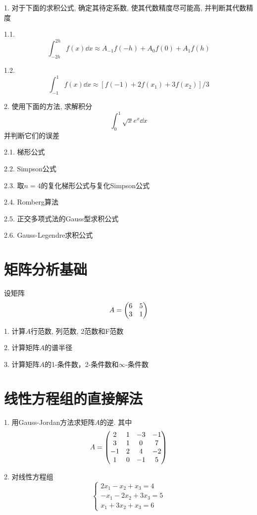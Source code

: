 1. 对于下面的求积公式, 确定其待定系数, 使其代数精度尽可能高, 并判断其代数精度

1.1. \begin{equation*}
    \int_{-2h}^{2h}f(x)\dd{x}\approx A_{-1}f(-h)+A_0f(0)+A_1f(h)
\end{equation*}

1.2. \begin{equation*}
    \int_{-1}^1f(x)\dd{x}\approx\left[f(-1)+2f(x_1)+3f(x_2)\right]/3
\end{equation*}

2. 使用下面的方法, 求解积分
\begin{equation*}
    \int_0^1\sqrt{x}e^x\dd{x}
\end{equation*}
并判断它们的误差

2.1. 梯形公式

2.2. Simpson公式

2.3. 取$n=4$的复化梯形公式与复化Simpson公式

2.4. Romberg算法

2.5. 正交多项式法的Gauss型求积公式

2.6. Gauss-Legendre求积公式

\section*{矩阵分析基础}

设矩阵
\begin{equation*}
    A=\mqty(
        6&5\\
        3&1
    )
\end{equation*}

1. 计算$A$行范数, 列范数, 2范数和F范数

2. 计算矩阵$A$的谱半径

3. 计算矩阵$A$的1-条件数，2-条件数和$\infty$-条件数

\section*{线性方程组的直接解法}

1. 用Gauss-Jordan方法求矩阵$A$的逆. 其中
\begin{equation*}
    A=\mqty(2&1&-3&-1\\
    3&1&0&7\\
    -1&2&4&-2\\
    1&0&-1&5)
\end{equation*}

2. 对线性方程组
\begin{equation*}
    \begin{cases}
        2x_1-x_2+x_3=4\\
        -x_1-2x_2+3x_3=5\\
        x_1+3x_2+x_3=6
    \end{cases}
\end{equation*}

